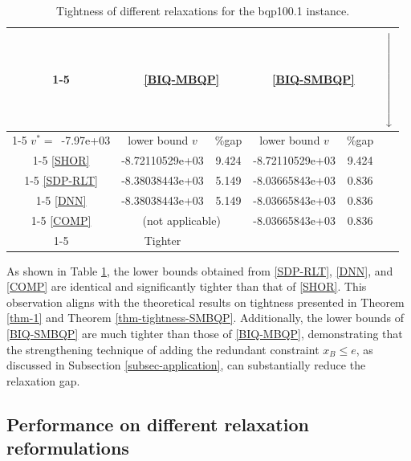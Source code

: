 \documentclass[11pt]{article}
\theoremstyle{plain}
\newcommand{\xdownarrow}[1]{%
  {\left\downarrow\vbox to #1{}\right.\kern-\nulldelimiterspace}
}
\begin{document}
\begin{table}[h!]
    \centering
    \renewcommand{\arraystretch}{1.25} %
    \begin{tabular}{|c|cc|cc|c}
        \cline{1-5}
         & \multicolumn{2}{c|}{\eqref{BIQ-MBQP}} & \multicolumn{2}{c|}{\eqref{BIQ-SMBQP}} & \multirow{6}{*}{$\xdownarrow{1.6cm}$}\\
        \cline{1-5}
        {$v^*=$\, -7.97e+03} & lower bound {$v$} & {\%gap} & lower bound {$v$} & {\%gap} & \\
        \cline{1-5}
        \eqref{SHOR} & -8.72110529e+03 & 9.424 & -8.72110529e+03 & 9.424 &  \\
        \cline{1-5}
        \eqref{SDP-RLT} & -8.38038443e+03 & 5.149 & -8.03665843e+03 & 0.836 & \\
        \cline{1-5}
        \eqref{DNN} & -8.38038443e+03 & 5.149 & -8.03665843e+03 & 0.836 & \\\cline{1-5}
        \eqref{COMP} & \multicolumn{2}{c|}{(not applicable)} & -8.03665843e+03 & 0.836 & \\
        \cline{1-5}
        \multicolumn{5}{c}{$\xrightarrow[\hspace{11cm}]{}$} & {Tighter} \\
    \end{tabular}
    \caption{Tightness of different relaxations for the bqp100.1 instance.}
    \label{tab-tightness}
\end{table}
%

As shown in Table \ref{tab-tightness}, the lower bounds obtained from \eqref{SDP-RLT}, \eqref{DNN}, and \eqref{COMP} are identical and significantly tighter than that of \eqref{SHOR}. This observation aligns with the theoretical results on tightness presented in Theorem \ref{thm-1} and Theorem \ref{thm-tightness-SMBQP}. Additionally, the lower bounds of \eqref{BIQ-SMBQP} are much tighter than those of \eqref{BIQ-MBQP}, demonstrating that the strengthening technique of adding the redundant constraint $x_B\leq e$, as discussed in Subsection \ref{subsec-application}, can substantially reduce the relaxation gap.


\subsection{Performance on different relaxation reformulations}\label{subsec-pp}
\end{document}
